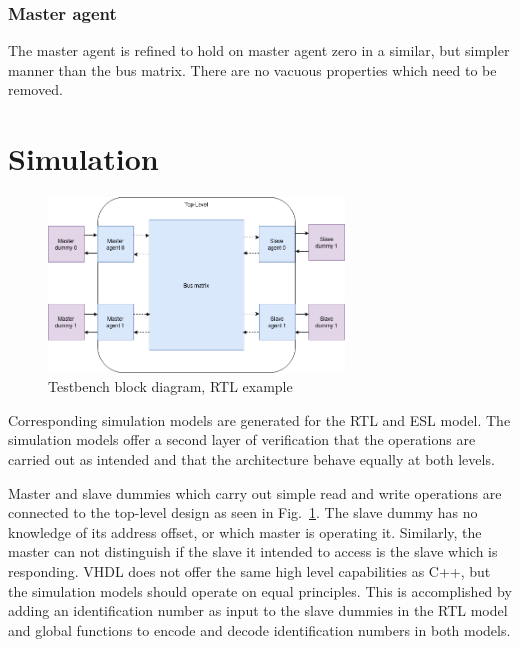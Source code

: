 \subsubsection{Master agent}
The master agent is refined to hold on master agent zero in a similar, but simpler manner than the bus matrix. There are no vacuous properties which need to be removed. 



\section{Simulation}
\label{sec:sim}
\begin{figure}[hbt]
    \begin{center}
        \includegraphics[width=0.7\textwidth]{figs/testbench.png}
    \end{center}
    \caption{Testbench block diagram, RTL example}
    \label{fig:testbench}
\end{figure}

Corresponding simulation models are generated for the RTL and ESL model. The simulation models offer a second layer of verification that the operations are carried out as intended and that the architecture behave equally at both levels. \par
Master and slave dummies which carry out simple read and write operations are connected to the top-level design as seen in Fig.~\ref{fig:testbench}. The slave dummy has no knowledge of its address offset, or which master is operating it. Similarly, the master can not distinguish if the slave it intended to access is the slave which is responding. VHDL does not offer the same high level capabilities as C++, but the simulation models should operate on equal principles. This is accomplished by adding an identification number as input to the slave dummies in the RTL model and global functions to encode and decode identification numbers in both models. 

